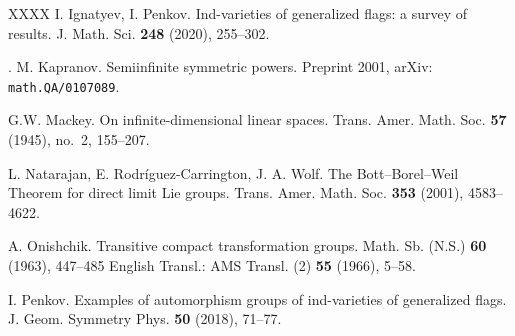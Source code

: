 \documentclass[11pt, a4paper]{article}
\begin{document}
\begin{thebibliography}{XXXX}
 I. Ignatyev, I. Penkov. Ind-varieties of generalized flags: a survey of results. J. Math. Sci. \textbf{248} (2020), 255--302.

. M. Kapranov. Semiinfinite symmetric powers. Preprint 2001, arXiv: \texttt{math.QA/0107089}.

 G.W. Mackey. On infinite-dimensional linear spaces. Trans. Amer. Math. Soc. \textbf{57} (1945), no.~2, 155--207.

 L. Natarajan, E. Rodr\'iguez-Carrington, J. A. Wolf. The Bott--Borel--Weil Theorem for direct limit
Lie groups. Trans. Amer. Math. Soc. \textbf{353} (2001), 4583--4622.

 A. Onishchik. Transitive compact transformation groups. Math. Sb. (N.S.) \textbf{60}
(1963), 447--485 English Transl.: AMS Transl. (2) \textbf{55} (1966), 5--58.

 I. Penkov. Examples of automorphism groups of ind-varieties of generalized flags. J. Geom. Symmetry Phys. \textbf{50} (2018), 71--77.


\end{thebibliography}
\end{document}
